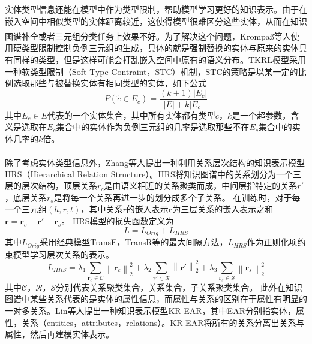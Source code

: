 \documentclass[twocolumn]{article}
\newcommand{\upcite}[1]{\textsuperscript{\textsuperscript{\cite{#1}}}}
\begin{document}
	实体类型信息还能在模型中作为类型限制，帮助模型学习更好的知识表示。由于在嵌入空间中相似类型的实体距离较近，这使得模型很难区分这些实体，从而在知识图谱补全或者三元组分类任务上效果不好。为了解决这个问题，Krompaß等人\upcite{typeconstrain}使用硬类型限制控制负例三元组的生成，具体的就是强制替换的实体与原来的实体具有同样的类型，但是这样可能会打乱嵌入空间中原有的语义分布。TKRL模型采用一种软类型限制（Soft Type Contraint，STC）机制，STC的策略是以某一定的比例选取那些与被替换实体有相同类型的实体，如下公式
	\begin{equation}
		P(\widetilde{e}\in E_c)=\frac{(k+1)\left | E_c \right |}{\left | E \right |+k\left | E_c \right |}
	\end{equation}
	其中$E_c\in E$代表的一个实体集合，其中所有实体都有类型$c$，$k$是一个超参数，含义是选取在$E_c$集合中的实体作为负例三元组的几率是选取那些不在$E_c$集合中的实体几率的$k$倍。
	
	除了考虑实体类型信息外，Zhang等人\upcite{HRS}提出一种利用关系层次结构的知识表示模型HRS（Hierarchical Relation Structure）。HRS将知识图谱中的关系划分为一个三层的层次结构，顶层关系$r_c$是由语义相近的关系聚类而成，中间层指特定的关系$r'$，底层关系$r_s$是将每一个关系再进一步的划分成多个子关系。
	在训练时，对于每一个三元组$(h,r,t)$，其中关系$r$的嵌入表示$\textbf{r}$为三层关系的嵌入表示之和
	$\textbf{r}=\textbf{r}_c+\textbf{r}'+\textbf{r}_s$。
	HRS模型的损失函数定义为
	\begin{equation}
		L=L_{Orig}+L_{HRS}
	\end{equation}
	其中$L_{Orig}$采用经典模型TransE，TransR等的最大间隔方法，$L_{HRS}$作为正则化项约束模型学习层次关系的表示。
	\begin{equation}
		L_{HRS}=\lambda_1\sum_{\textbf{r}_c\in \mathcal{C}}\left \| \textbf{r}_c \right \|_2^2+\lambda_2\sum_{\textbf{r}'\in \mathcal{R}}\left \| \textbf{r}' \right \|_2^2+\lambda_3\sum_{\textbf{r}_s\in\mathcal{S}}\left \| \textbf{r}_s \right \|_2^2
	\end{equation}
	其中$\mathcal{C}$，$\mathcal{R}$，$\mathcal{S}$分别代表关系聚类集合，关系集合，子关系聚类集合。
	此外在知识图谱中某些关系代表的是实体的属性信息，而属性与关系的区别在于属性有明显的一对多关系。Lin等人提出一种知识表示模型KR-EAR，其中EAR分别指实体，属性，关系（entities，attributes，relations）。KR-EAR将所有的关系分离出关系与属性，然后再建模实体表示。
	
	
\end{document}
